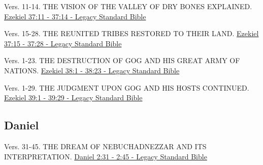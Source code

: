 \documentclass[
  ignorenonframetext,
]{beamer}
\begin{document}
\begin{frame}{37}
\label{section-101}
\begin{block}{Vers. 11-14. THE VISION OF THE VALLEY OF DRY BONES
EXPLAINED.}
\label{vers.-11-14.-the-vision-of-the-valley-of-dry-bones-explained.}
\href{https://read.lsbible.org/?q=ezek37\%3A11-14}{Ezekiel 37:11 - 37:14
- Legacy Standard Bible}
\end{block}

\begin{block}{Vers. 15-28. THE REUNITED TRIBES RESTORED TO THEIR LAND.}
\label{vers.-15-28.-the-reunited-tribes-restored-to-their-land.}
\href{https://read.lsbible.org/?q=ezek37\%3A15-28}{Ezekiel 37:15 - 37:28
- Legacy Standard Bible}
\end{block}
\end{frame}

\begin{frame}{38}
\label{section-102}
\begin{block}{Vers. 1-23. THE DESTRUCTION OF GOG AND HIS GREAT ARMY OF
NATIONS.}
\label{vers.-1-23.-the-destruction-of-gog-and-his-great-army-of-nations.}
\href{https://read.lsbible.org/?q=ezek38\%3A1-23}{Ezekiel 38:1 - 38:23 -
Legacy Standard Bible}
\end{block}
\end{frame}

\begin{frame}{39}
\label{section-103}
\begin{block}{Vers. 1-29. THE JUDGMENT UPON GOG AND HIS HOSTS
CONTINUED.}
\label{vers.-1-29.-the-judgment-upon-gog-and-his-hosts-continued.}
\href{https://read.lsbible.org/?q=ezek39\%3A1-29}{Ezekiel 39:1 - 39:29 -
Legacy Standard Bible}
\end{block}
\end{frame}

\subsection{Daniel}\label{daniel}

\begin{frame}{2}
\label{section-104}
\begin{block}{Vers. 31-45. THE DREAM OF NEBUCHADNEZZAR AND ITS
INTERPRETATION.}
\label{vers.-31-45.-the-dream-of-nebuchadnezzar-and-its-interpretation.}
\href{https://read.lsbible.org/?q=dan2\%3A31-45}{Daniel 2:31 - 2:45 -
Legacy Standard Bible}
\end{block}
\end{frame}
\end{document}

